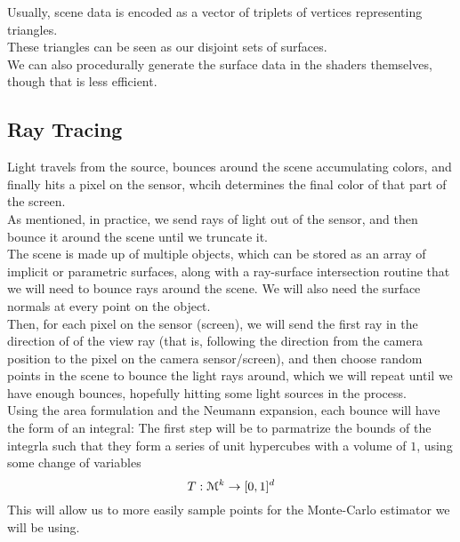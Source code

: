 \documentclass[12pt]{article}
\begin{document}
Usually, scene data is encoded as a vector
of triplets of vertices representing triangles. \\
These triangles can be seen as our disjoint
sets of surfaces. \\
We can also procedurally generate the surface
data in the shaders themselves, though that is
less efficient. \\

\newpage

\subsection*{Ray Tracing}

Light travels from the source, bounces around the
scene accumulating colors, and finally hits a pixel
on the sensor, whcih determines the final color
of that part of the screen. \\

As mentioned, in practice, we send rays of
light out of the sensor, and then bounce it around
the scene until we truncate it. \\

The scene is made up of multiple objects, which
can be stored as an array of implicit or parametric
surfaces, along with a ray-surface intersection
routine that we will need to bounce rays
around the scene. We will also need the
surface normals at every point on the object. \\

Then, for each pixel on the sensor (screen), we will
send the first ray in the direction of of the view ray
(that is, following the direction from the camera position
to the pixel on the camera sensor/screen), and then choose
random points in the scene to bounce the light rays
around, which we will repeat until we have
enough bounces, hopefully hitting some light sources in
the process. \\

Using the area formulation and the Neumann expansion, 
each bounce will have the form of an integral:
The first step will be to parmatrize the bounds of the
integrla such that they form a series of unit hypercubes
with a volume of $1$, using some change of variables
\[ T: \mathcal{M}^k \to [0, 1]^d \]
This will allow us to more easily sample points
for the Monte-Carlo estimator we will be using. \\
\end{document}

